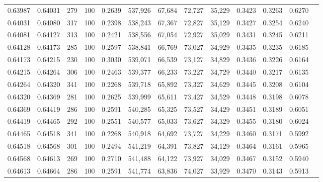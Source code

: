 \begin{tabular}{rrrrrrrrrrrrr}
0.63987 & 0.64031 &   279 & 100 &                                     0.2639 & 537,926 &  67,684 &  72,727 &  35,229 & 0.3423 & 0.3263 & 0.6270 \\
0.64031 & 0.64080 &   317 & 100 &                                     0.2398 & 538,243 &  67,367 &  72,827 &  35,129 & 0.3427 & 0.3254 & 0.6240 \\
0.64081 & 0.64127 &   313 & 100 &                                     0.2421 & 538,556 &  67,054 &  72,927 &  35,029 & 0.3431 & 0.3245 & 0.6211 \\
0.64128 & 0.64173 &   285 & 100 &                                     0.2597 & 538,841 &  66,769 &  73,027 &  34,929 & 0.3435 & 0.3235 & 0.6185 \\
0.64173 & 0.64215 &   230 & 100 &                                     0.3030 & 539,071 &  66,539 &  73,127 &  34,829 & 0.3436 & 0.3226 & 0.6164 \\
0.64215 & 0.64264 &   306 & 100 &                                     0.2463 & 539,377 &  66,233 &  73,227 &  34,729 & 0.3440 & 0.3217 & 0.6135 \\
0.64264 & 0.64320 &   341 & 100 &                                     0.2268 & 539,718 &  65,892 &  73,327 &  34,629 & 0.3445 & 0.3208 & 0.6104 \\
0.64320 & 0.64369 &   281 & 100 &                                     0.2625 & 539,999 &  65,611 &  73,427 &  34,529 & 0.3448 & 0.3198 & 0.6078 \\
0.64369 & 0.64419 &   286 & 100 &                                     0.2591 & 540,285 &  65,325 &  73,527 &  34,429 & 0.3451 & 0.3189 & 0.6051 \\
0.64419 & 0.64465 &   292 & 100 &                                     0.2551 & 540,577 &  65,033 &  73,627 &  34,329 & 0.3455 & 0.3180 & 0.6024 \\
0.64465 & 0.64518 &   341 & 100 &                                     0.2268 & 540,918 &  64,692 &  73,727 &  34,229 & 0.3460 & 0.3171 & 0.5992 \\
0.64518 & 0.64568 &   301 & 100 &                                     0.2494 & 541,219 &  64,391 &  73,827 &  34,129 & 0.3464 & 0.3161 & 0.5965 \\
0.64568 & 0.64613 &   269 & 100 &                                     0.2710 & 541,488 &  64,122 &  73,927 &  34,029 & 0.3467 & 0.3152 & 0.5940 \\
0.64613 & 0.64664 &   286 & 100 &                                     0.2591 & 541,774 &  63,836 &  74,027 &  33,929 & 0.3470 & 0.3143 & 0.5913 \\

\end{tabular}
